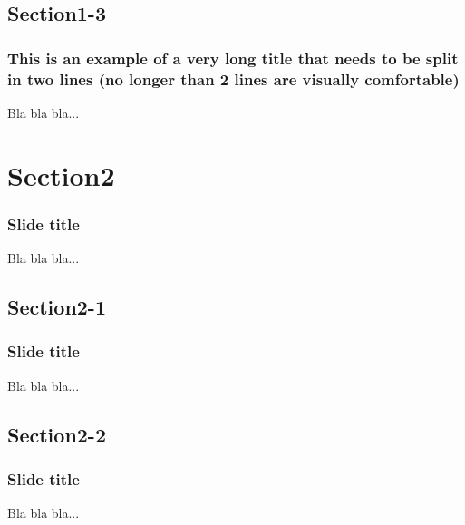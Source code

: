 \documentclass[t,compress,aspectratio=43,12p]{beamer} %
\begin{document}
\subsection{Section1-3}
\begin{frame}
\frametitle{This is an example of a very long title that needs to be split in two lines (no longer than 2 lines are visually comfortable)}
Bla bla bla...
\end{frame}



\section{Section2}
\begin{frame}
\frametitle{Slide title}
Bla bla bla...
\end{frame}

\subsection{Section2-1}
\begin{frame}
\frametitle{Slide title}
Bla bla bla...
\end{frame}

\subsection{Section2-2}
\begin{frame}
\frametitle{Slide title}
Bla bla bla...
\end{frame}


\begin{frame}

\begin{center}
\begin{minipage}{0.8\textwidth}
\end{minipage}
\end{center}
\end{frame}

\begin{frame}
  \printbibliography
\end{frame}





\end{document}
